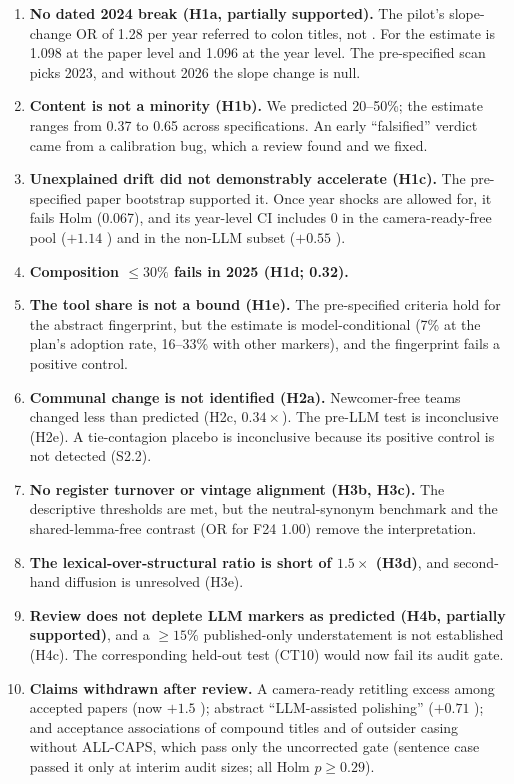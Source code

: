 \begin{enumerate}
\item \textbf{No dated 2024 break (H1a, partially supported).} The pilot's slope-change OR of 1.28 per year referred to colon titles, not \NAME. For \NAME{} the estimate is 1.098 at the paper level and 1.096  at the year level. The pre-specified scan picks 2023, and without 2026 the slope change is null.
\item \textbf{Content is not a minority (H1b).} We predicted 20--50\%; the estimate ranges from 0.37 to 0.65 across specifications. An early ``falsified'' verdict came from a calibration bug, which a review found and we fixed.
\item \textbf{Unexplained drift did not demonstrably accelerate (H1c).} The pre-specified paper bootstrap supported it. Once year shocks are allowed for, it fails Holm (0.067), and its year-level CI includes 0 in the camera-ready-free pool ($+1.14$\pp{} ) and in the non-LLM subset ($+0.55$\pp{} ).
\item \textbf{Composition $\leq 30\%$ fails in 2025 (H1d; 0.32).}
\item \textbf{The tool share is not a bound (H1e).} The pre-specified criteria hold for the abstract fingerprint, but the estimate is model-conditional (7\% at the plan's adoption rate, 16--33\% with other markers), and the fingerprint fails a positive control.
\item \textbf{Communal change is not identified (H2a).} Newcomer-free teams changed less than predicted (H2c, $0.34\times$). The pre-LLM test is inconclusive (H2e). A tie-contagion placebo is inconclusive because its positive control is not detected (S2.2).
\item \textbf{No register turnover or vintage alignment (H3b, H3c).} The descriptive thresholds are met, but the neutral-synonym benchmark and the shared-lemma-free contrast (OR for F24 1.00) remove the interpretation.
\item \textbf{The lexical-over-structural ratio is short of $1.5\times$ (H3d)}, and second-hand diffusion is unresolved (H3e).
\item \textbf{Review does not deplete LLM markers as predicted (H4b, partially supported)}, and a $\geq 15\%$ published-only understatement is not established (H4c). The corresponding held-out test (CT10) would now fail its audit gate.
\item \textbf{Claims withdrawn after review.} A camera-ready retitling excess among accepted papers (now $+1.5$\pp{} ); abstract ``LLM-assisted polishing'' ($+0.71$\pp{} ); and acceptance associations of compound titles and of outsider casing without ALL-CAPS, which pass only the uncorrected gate (sentence case passed it only at interim audit sizes; all Holm $p \geq 0.29$).
\end{enumerate}

